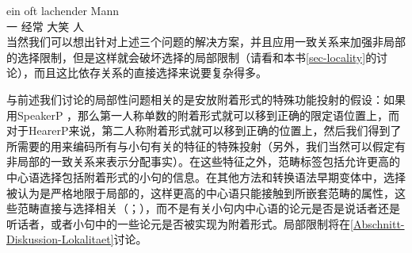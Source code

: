 \ex
\gll ein oft lachender Mann\\
     一 经常 大笑 人\\
\zl     
当然我们可以想出针对上述三个问题的解决方案，并且应用一致关系来加强非局部的选择限制，但是这样就会破坏选择的局部限制（请看\citealp[]{Ernst92a}和本书\ref{sec-locality}的讨论），而且这比依存关系的直接选择来说要复杂得多。

与前述我们讨论的局部性问题相关的是安放附着形式的特殊功能投射的假设：如果用SpeakerP ，那么第一人称单数的附着形式就可以移到正确的限定语位置上，而对于HearerP来说，第二人称附着形式就可以移到正确的位置上\citep[]{Poletto2000a-u}，然后我们得到了所需要的用来编码所有与小句有关的特征的特殊投射（另外，我们当然可以假定有非局部的一致关系来表示分配事实）。在这些特征之外，范畴标签包括允许更高的中心语选择包括附着形式的小句的信息。在其他方法和转换语法早期变体中，选择被认为是严格地限于局部的，这样更高的中心语只能接触到所嵌套范畴的属性，这些范畴直接与选择相关（\citealp[]{Abraham2005a}；\citealp{Sag2007a}），而不是有关小句内中心语的论元是否是说话者还是听话者，或者小句中的一些论元是否被实现为附着形式。局部限制将在\ref{Abschnitt-Diskussion-Lokalitaet}讨论。

